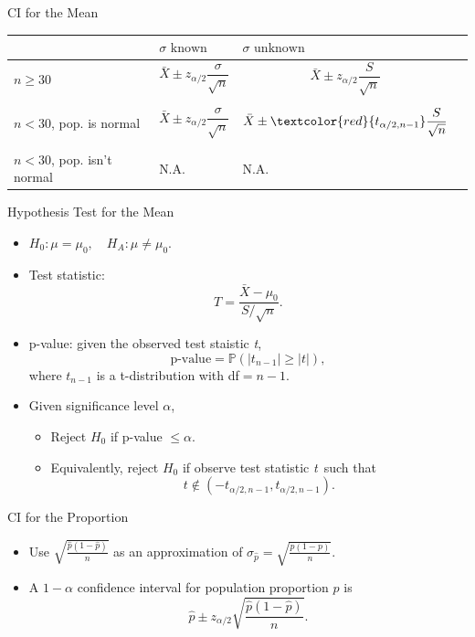 \documentclass{beamer}
\newcommand{\pr}{\mathbb{P}}
\newcommand{\h}{\widehat}
\newcommand{\TS}{\textit{T}}
\newcommand{\ts}{\textit{t}}
\begin{document}
\begin{frame}{CI for the Mean}
 \begin{table}
 \begin{center}
 \begin{tabular}{|M{3cm}|M{3cm}|M{3cm}|N}
 \hline
  & $\sigma \text{ known}$ & $\sigma \text{ unknown}$ \\[5pt]\hline
 $n\geq 30$ & 
$$ \bar X \pm z_{\alpha/2} \frac{\sigma}{\sqrt{n}}$$ & 
$$ \bar X \pm z_{\alpha/2} \frac{S}{\sqrt{n}}$$  \\[20pt] \hline
 $n< 30$, pop. is normal &  
$$ \bar X \pm z_{\alpha/2} \frac{\sigma}{\sqrt{n}} $$& 
$$ \bar X \pm \textcolor{red}{t_{\alpha/2,n-1}} \frac{S}{\sqrt{n}}$$  \\ [20pt]\hline
$n< 30$, pop. isn't normal & 
 N.A. & N.A. \\ \hline
 \end{tabular}
 \end{center}
 \end{table}
\end{frame}

\begin{frame}{Hypothesis Test for the Mean}
\begin{itemize}
    \item $H_0: \mu = \mu_0, \quad H_A: \mu \ne \mu_0$.
    \item Test statistic:
            $$\TS = \frac{\bar X - \mu_0 }{S/\sqrt{n}}.$$
    \item p-value: given the observed test staistic \ts,
        $$\text{p-value}=\pr(|t_{n-1}| \geq |\ts|),$$
        where $t_{n-1}$ is a t-distribution with df$=n-1$.
    \item Given significance level $\alpha$, 
        \begin{itemize}
            \item Reject $H_0$ if p-value $\leq \alpha$.
            \item Equivalently, reject $H_0$ if observe test statistic \ts\ such that
                $$t \not\in (-t_{\alpha/2,n-1}, t_{\alpha/2,n-1}).$$
        \end{itemize}
\end{itemize}
\end{frame}


\begin{frame}{CI for the Proportion}
\begin{itemize}
\item Use $\sqrt{\frac{\h p(1-\h p)}{n}}$ as an approximation of $\sigma_{\h p} = \sqrt{\frac{p(1-p)}{n}}$. 
\item A $1-\alpha$ confidence interval for population proportion $p$ is 
\[
    \h p \pm z_{\alpha/2} \sqrt{\frac{\h p(1-\h p)}{n}}.
\]
\end{itemize}
\end{frame}
\end{document}
